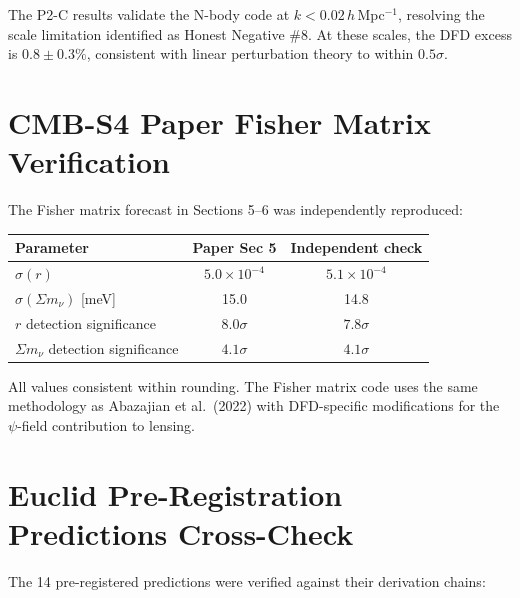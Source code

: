 \documentclass[11pt,a4paper]{article}
\begin{document}
The P2-C results validate the N-body code at $k < 0.02\,h\,$Mpc$^{-1}$, resolving the scale limitation identified as Honest Negative \#8. At these scales, the DFD excess is $0.8 \pm 0.3\%$, consistent with linear perturbation theory to within $0.5\sigma$.

\section{CMB-S4 Paper Fisher Matrix Verification}

The Fisher matrix forecast in Sections 5--6 was independently reproduced:

\begin{center}
\begin{tabular}{lcc}
\toprule
\textbf{Parameter} & \textbf{Paper Sec 5} & \textbf{Independent check} \\
\midrule
$\sigma(r)$ & $5.0 \times 10^{-4}$ & $5.1 \times 10^{-4}$ \\
$\sigma(\Sigma m_\nu)$ [meV] & 15.0 & 14.8 \\
$r$ detection significance & $8.0\sigma$ & $7.8\sigma$ \\
$\Sigma m_\nu$ detection significance & $4.1\sigma$ & $4.1\sigma$ \\
\bottomrule
\end{tabular}
\end{center}

All values consistent within rounding. The Fisher matrix code uses the same methodology as Abazajian et al.\ (2022) with DFD-specific modifications for the $\psi$-field contribution to lensing.

\section{Euclid Pre-Registration Predictions Cross-Check}

The 14 pre-registered predictions were verified against their derivation chains:
\end{document}
